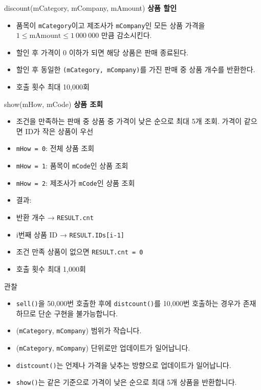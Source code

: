 \documentclass{beamer}
\begin{document}
\begin{frame}{discount(mCategory, mCompany, mAmount)}
\textbf{상품 할인}

\begin{itemize}
    \item 품목이 \texttt{mCategory}이고 제조사가 \texttt{mCompany}인 모든 상품 가격을 $1 \le \text{mAmount} \le 1\ 000\ 000$ 만큼 감소시킨다.
    \item 할인 후 가격이 0 이하가 되면 해당 상품은 판매 종료된다.
    \item 할인 후 동일한 \texttt{(mCategory, mCompany)}를 가진 판매 중 상품 개수를 반환한다.
    \item 호출 횟수 최대 10,000회
\end{itemize}
\end{frame}

\begin{frame}{show(mHow, mCode)}
\textbf{상품 조회}

\begin{itemize}
    \item 조건을 만족하는 판매 중 상품 중 가격이 낮은 순으로 최대 5개 조회. 가격이 같으면 ID가 작은 상품이 우선
    \item \texttt{mHow = 0}: 전체 상품 조회
    \item \texttt{mHow = 1}: 품목이 \texttt{mCode}인 상품 조회
    \item \texttt{mHow = 2}: 제조사가 \texttt{mCode}인 상품 조회
    \item 결과:
    \item 반환 개수 → \texttt{RESULT.cnt}
    \item i번째 상품 ID → \texttt{RESULT.IDs[i-1]}
    \item 조건 만족 상품이 없으면 \texttt{RESULT.cnt = 0}
    \item 호출 횟수 최대 1,000회
\end{itemize}
\end{frame}

\begin{frame}{관찰}
\begin{itemize}
    \item \texttt{sell()}을 50,000번 호출한 후에 \texttt{distcount()}를 10,000번 호출하는 경우가 존재하므로 단순 구현을 불가능합니다.
    \item (\texttt{mCategory}, \texttt{mCompany}) 범위가 작습니다.
    \item (\texttt{mCategory}, \texttt{mCompany}) 단위로만 업데이트가 일어납니다.
    \item \texttt{distcount()}는 언제나 가격을 낮추는 방향으로 업데이트가 일어납니다.
    \item \texttt{show()}는 같은 기준으로 가격이 낮은 순으로 최대 5개 상품을 반환합니다.
\end{itemize}
\end{frame}
\end{document}
